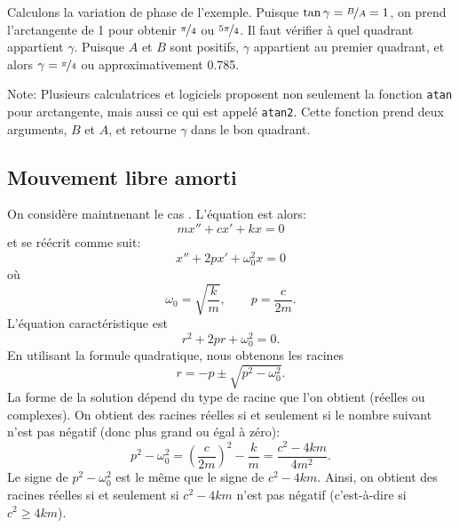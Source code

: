 Calculons la variation de phase de l'exemple.
Puisque $\tan \gamma = \nicefrac{B}{A} = 1$, on prend l'arctangente de 1 pour obtenir $\nicefrac{\pi}{4}$ ou $\nicefrac{5\pi}{4}$. 
Il faut vérifier à quel quadrant appartient $\gamma$.
Puisque  $A$ et $B$ sont positifs, $\gamma$ appartient au premier quadrant, et alors $\gamma =
\nicefrac{\pi}{4}$ ou approximativement 0.785.

Note: Plusieurs calculatrices et logiciels proposent non seulement la fonction 
\texttt{atan} pour arctangente, mais aussi ce qui est appelé  \texttt{atan2}.
Cette fonction prend deux arguments, $B$ et $A$, et retourne $\gamma$ dans le bon quadrant.

\subsection{Mouvement libre amorti}


On considère maintnenant le cas .  L'équation est alors: 
\begin{equation*}
m x'' + c x' + kx = 0
\end{equation*}
et se réécrit comme suit: 
\begin{equation*}
x'' + 2p x' + \omega_0^2 x = 0
\end{equation*}
où
\begin{equation*}
\omega_0 = \sqrt{\frac{k}{m}}, \qquad p = \frac{c}{2m} .
\end{equation*}
L'équation caractéristique est
\begin{equation*}
r^2 + 2 pr + \omega_0^2 = 0 .
\end{equation*}
En utilisant la formule quadratique, nous obtenons les racines 
\begin{equation*}
r = -p \pm \sqrt{p^2 - \omega_0^2} .
\end{equation*}
La forme de la solution dépend du type de racine que l'on obtient (réelles ou complexes). 
On obtient des racines réelles si et seulement si le nombre suivant n'est pas négatif (donc plus grand ou égal à zéro): 
\begin{equation*}
p^2 - \omega_0^2 = {\left( \frac{c}{2m} \right)}^2 - \frac{k}{m}
= \frac{c^2 - 4km}{4m^2} .
\end{equation*}
Le signe de $p^2-\omega_0^2$ est le même que le signe de
$c^2 - 4km$.  Ainsi, on obtient des racines réelles si et seulement si  $c^2-4km$ n'est pas négatif (c'est-à-dire si $c^2 \geq 4km$).

